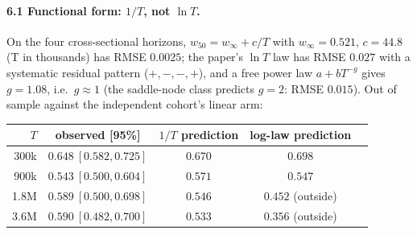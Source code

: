 \documentclass[11pt]{article}
\theoremstyle{definition}
\theoremstyle{remark}
\newcommand{\wfifty}{w_{50}}
\begin{document}
\paragraph{6.1 Functional form: $1/T$, not $\ln T$.}
On the four cross-sectional horizons, $\wfifty=w_\infty+c/T$ with $w_\infty=0.521$, $c=44.8$ (T in thousands) has RMSE $0.0025$; the paper's $\ln T$ law has RMSE $0.027$ with a systematic residual pattern ($+,-,-,+$), and a free power law $a+bT^{-g}$ gives $g=1.08$, i.e.\ $g\approx1$ (the saddle-node class predicts $g=2$: RMSE $0.015$). Out of sample against the independent cohort's linear arm:
\begin{center}\small
\begin{tabular}{rcccc}
\toprule
$T$ & observed [95\%] & $1/T$ prediction & log-law prediction \\
\midrule
300k & $0.648\ [0.582,0.725]$ & $0.670$ & $0.698$\\
900k & $0.543\ [0.500,0.604]$ & $0.571$ & $0.547$\\
1.8M & $0.589\ [0.500,0.698]$ & $0.546$ & $0.452$ (outside)\\
3.6M & $0.590\ [0.482,0.700]$ & $0.533$ & $0.356$ (outside)\\
\bottomrule
\end{tabular}
\end{center}
\end{document}
